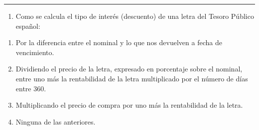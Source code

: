 \documentclass[
  letterpaper,
  DIV=11,
  numbers=noendperiod]{scrreprt}
\providecommand{\tightlist}{%
  \setlength{\itemsep}{0pt}\setlength{\parskip}{0pt}}\usepackage{longtable,booktabs,array}
\begin{document}
\begin{center}\rule{0.5\linewidth}{0.5pt}\end{center}

\begin{enumerate}
\def\labelenumi{\arabic{enumi}.}
\setcounter{enumi}{1}
\tightlist
\item
  Como se calcula el tipo de interés (descuento) de una letra del Tesoro
  Público español:
\end{enumerate}

\begin{enumerate}
\def\labelenumi{\alph{enumi}.}
\item
  Por la diferencia entre el nominal y lo que nos devuelven a fecha de
  vencimiento.
\item
  Dividiendo el precio de la letra, expresado en porcentaje sobre el
  nominal, entre uno más la rentabilidad de la letra multiplicado por el
  número de días entre 360.
\item
  Multiplicando el precio de compra por uno más la rentabilidad de la
  letra.
\item
  Ninguna de las anteriores.
\end{enumerate}
\end{document}
